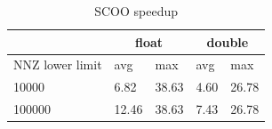\documentclass{article}
\begin{document}
\begin{figure}[H]
\centering
{}
\qquad %
\end{figure}

\begin{table}[H]
	\centering
	\begin{tabular}{ |p{2.6cm}||p{1cm}|p{1cm}|p{1cm}|p{1cm}|  }
	 \hline
		& \multicolumn{2}{|c|}{float} & \multicolumn{2}{|c|}{double}\\
	 \hline
	 NNZ lower limit & avg & max & avg & max  \\
	 \hline
	 10000  & 6.82  & 38.63 & 4.60 & 26.78 \\
	 100000 & 12.46 & 38.63 & 7.43 & 26.78 \\
	 \hline
	\end{tabular}
	\caption{SCOO speedup}
  \label{scoo_speedup_table}
\end{table}
\end{document}

